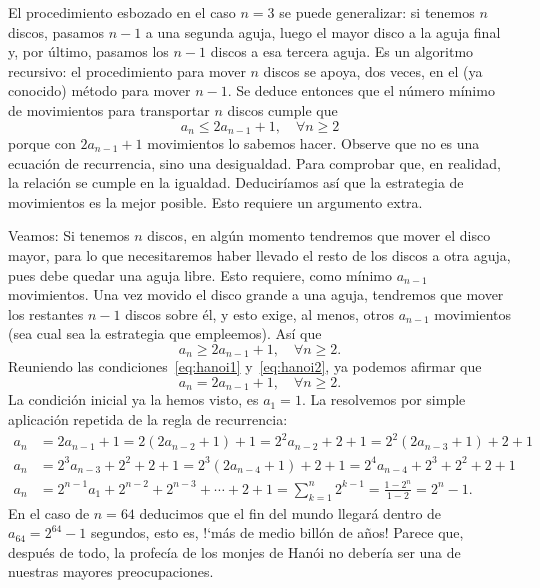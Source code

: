 El procedimiento esbozado en el caso $n=3$ se puede generalizar: si tenemos $n$ discos, pasamos $n-1$ a una segunda aguja, luego el mayor disco a la aguja final y, por último, pasamos los $n-1$ discos a esa tercera aguja. Es un algoritmo recursivo: el procedimiento para mover $n$ discos se apoya, dos veces, en el (ya conocido) método para mover $n-1$. Se deduce entonces que el número mínimo de movimientos para transportar $n$ discos cumple que
\begin{equation}\label{eq:hanoi1}
	a_{n}\leq 2a_{n-1}+1,\quad\forall n\geq2
\end{equation} porque con $2a_{n-1}+1$ movimientos lo sabemos hacer. Observe que no es una ecuación de recurrencia, sino una desigualdad. Para comprobar que, en realidad, la
relación se cumple en la igualdad. Deduciríamos así que la estrategia de movimientos es la mejor posible. Esto requiere un argumento extra.

Veamos: Si tenemos $n$ discos, en algún momento tendremos que mover el disco mayor, para lo que necesitaremos haber llevado el resto de los discos a otra aguja, pues debe quedar una aguja libre. Esto requiere, como mínimo $a_{n-1}$ movimientos. Una vez movido el disco grande a una aguja, tendremos que mover los restantes $n-1$ discos sobre él, y esto exige, al menos, otros $a_{n-1}$ movimientos (sea cual sea la estrategia que empleemos). Así que
\begin{equation}\label{eq:hanoi2}
	a_{n}\geq 2a_{n-1}+1,\quad\forall n \geq 2.
\end{equation}
Reuniendo las condiciones~\eqref{eq:hanoi1} y~\eqref{eq:hanoi2}, ya podemos afirmar que
\begin{equation}
	a_{n}= 2a_{n-1}+1,\quad\forall n\geq2.
\end{equation}
La condición inicial ya la hemos visto, es $a_{1}=1$. La resolvemos por simple aplicación repetida de la regla de recurrencia:
\begin{align*}
	a_{n}&=2a_{n-1}+1=2\left(2a_{n-2}+1\right)+1=2^{2}a_{n-2}+2+1=2^{2}\left(2a_{n-3}+1\right)+2+1\\
	a_{n}&= 2^{3}a_{n-3}+2^{2}+2+1=2^{3}(2a_{n-4}+1)+2+1=2^{4}a_{n-4}+2^{3}+2^{2}+2+1\\
	a_{n}&=2^{n-1}a_{1}+2^{n-2}+2^{n-3}+\cdots+2+1=\sum_{k=1}^{n}2^{k-1}=\frac{1-2^{n}}{1-2}=2^{n}-1.
\end{align*}
En el caso de $n=64$ deducimos que el fin del mundo llegará dentro de $a_{64}= 2^{64}-1$ segundos, esto es, !`más de medio billón de años! Parece que, después de todo, la profecía de los monjes de Hanói no debería ser una de nuestras mayores preocupaciones.

